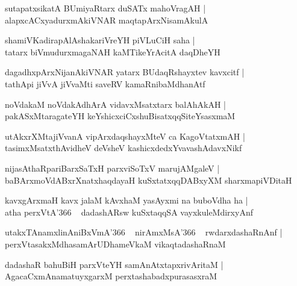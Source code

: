 \documentclass[twoside,12pt,openright]{book}
\newcounter{shloka}[chapter]
\begin{document}
\begin{shloka}%
sutapatxsikatA BUmiyaRtarx duSATx mahoVragAH |\\
alapxcACxyadurxmAkiVNAR maqtapArxNisamAkulA 
\end{shloka}

\begin{shloka}%
shamiVKadirapAlAshakariVreYH piVLuCiH saha |\\
tatarx biVmudurxmagaNAH kaMTikeYrAcitA daqDheYH
\end{shloka}

\begin{shloka}%
dagadhxpArxNijanAkiVNAR yatarx BUdaqRshayxtev kavxcitf |\\
tathApi jiVvA jiVvaMti saveRV kamaRnibaMdhanAtf
\end{shloka}

\begin{shloka}%
noVdakaM noVdakAdhArA vidavxMsatxtarx balAhAkAH |\\
pakASxMtaragateYH keYshicxciCxshuBisatxqqSiteYsasxmaM 
\end{shloka}

\begin{shloka}%
utAkxrXMtajiVvanA vipArxdaqshayxMteV ca KagoVtatxmAH |\\
tasimxMsatxthAvidheV deVsheV kashicxdedxYvavashAdavxNikf
\end{shloka}

\begin{shloka}%
nijasAthaRpariBarxSaTxH parxviSoTxV marujAMgaleV |\\
baBArxmoVdABxrXnatxhaqdayaH kuSxtatxqqDABxyXM sharxmapiVDitaH 
\end{shloka}

\begin{shloka}%
kavxgArxmaH kavx jalaM kAvxhaM yasAyxmi na buboVdha ha |\\
atha perxVtA\char'366 ~ dadashARsw kuSxtaqqSA vayxkuleMdirxyAnf
\end{shloka}

\begin{shloka}%
utakxTAnamxlinAniBxVmA\char'366 ~ nirAmxMsA\char'366 ~ rwdarxdashaRnAnf |\\
perxVtasakxMdhasamArUDhameVkaM vikaqtadashaRnaM 
\end{shloka}

\begin{shloka}%
dadashaR bahuBiH parxVteYH samAnAtxtapxrivAritaM |\\
AgacaCxmAnamatuyxgarxM perxtashabadxpurasasxraM 
\end{shloka}
\end{document}
